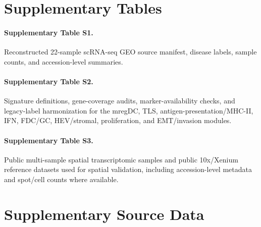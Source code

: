 \documentclass[11pt]{article}
\begin{document}
\clearpage
\section*{Supplementary Tables}

\paragraph{Supplementary Table S1.}
Reconstructed 22-sample scRNA-seq GEO source manifest, disease labels, sample counts, and accession-level summaries.

\paragraph{Supplementary Table S2.}
Signature definitions, gene-coverage audits, marker-availability checks, and legacy-label harmonization for the mregDC, TLS, antigen-presentation/MHC-II, IFN, FDC/GC, HEV/stromal, proliferation, and EMT/invasion modules.

\paragraph{Supplementary Table S3.}
Public multi-sample spatial transcriptomic samples and public 10x/Xenium reference datasets used for spatial validation, including accession-level metadata and spot/cell counts where available.

\section*{Supplementary Source Data}
\end{document}

